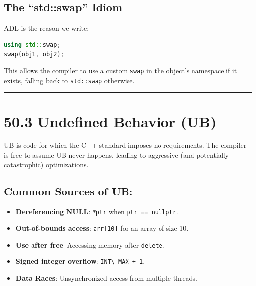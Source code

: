 \hypertarget{the-stdswap-idiom}{%
\subsection{The ``std::swap'' Idiom}\label{the-stdswap-idiom}}

ADL is the reason we write:

\begin{lstlisting}[language={C++}]
using std::swap;
swap(obj1, obj2);
\end{lstlisting}

This allows the compiler to use a custom \passthrough{\lstinline!swap!}
in the object's namespace if it exists, falling back to
\passthrough{\lstinline!std::swap!} otherwise.

\begin{center}\rule{0.5\linewidth}{0.5pt}\end{center}

\hypertarget{undefined-behavior-ub}{%
\section{50.3 Undefined Behavior (UB)}\label{undefined-behavior-ub}}

UB is code for which the C++ standard imposes no requirements. The
compiler is free to assume UB never happens, leading to aggressive (and
potentially catastrophic) optimizations.

\hypertarget{common-sources-of-ub}{%
\subsection{Common Sources of UB:}\label{common-sources-of-ub}}

\begin{itemize}
\tightlist
\item
  \textbf{Dereferencing NULL}: \passthrough{\lstinline!*ptr!} when
  \passthrough{\lstinline!ptr == nullptr!}.
\item
  \textbf{Out-of-bounds access}: \passthrough{\lstinline!arr[10]!} for
  an array of size 10.
\item
  \textbf{Use after free}: Accessing memory after
  \passthrough{\lstinline!delete!}.
\item
  \textbf{Signed integer overflow}:
  \passthrough{\lstinline!INT\_MAX + 1!}.
\item
  \textbf{Data Races}: Unsynchronized access from multiple threads.
\end{itemize}

